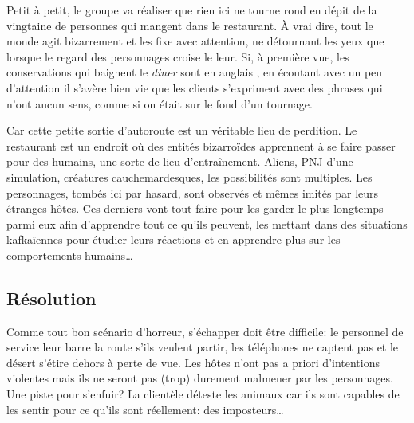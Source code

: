 Petit à petit, le groupe va réaliser que rien ici ne tourne rond en dépit de la vingtaine de personnes qui mangent dans le restaurant.
À vrai dire, tout le monde agit bizarrement et les fixe avec attention, ne détournant les yeux que lorsque le regard des personnages croise le leur.
Si, à première vue, les conservations qui baignent le \emph{diner} sont en \og anglais \fg, en écoutant avec un peu d'attention il s'avère bien vie que les clients s'expriment avec des phrases qui n'ont aucun sens, comme si on était sur le fond d'un tournage.

Car cette petite sortie d'autoroute est un véritable lieu de perdition.
Le restaurant est un endroit où des entités bizarroïdes apprennent à se faire passer pour des humains, une sorte de lieu d'entraînement.
Aliens, PNJ d'une simulation, créatures cauchemardesques, les possibilités sont multiples.
Les personnages, tombés ici par hasard, sont observés et mêmes imités par leurs étranges hôtes.
Ces derniers vont tout faire pour les garder le plus longtemps parmi eux afin d'apprendre tout ce qu'ils peuvent, les mettant dans des situations kafkaïennes pour étudier leurs réactions et en apprendre plus sur les comportements humains\dots

\subsection{Résolution}

Comme tout bon scénario d'horreur, s'échapper doit être difficile: le personnel de service leur barre la route s'ils veulent partir, les téléphones ne captent pas et le désert s'étire dehors à perte de vue.
Les hôtes n'ont pas a priori d'intentions violentes mais ils ne seront pas (trop) durement malmener par les personnages.
Une piste pour s'enfuir? La clientèle déteste les animaux car ils sont capables de les sentir pour ce qu'ils sont réellement: des imposteurs\dots

\vfill
{}
\vfill
